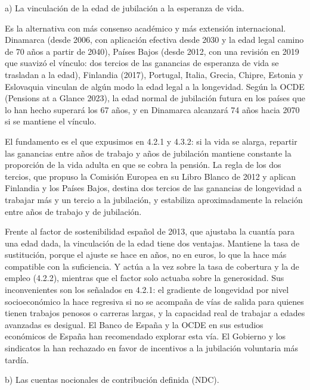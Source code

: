 \documentclass[10pt,a4paper]{article}
\begin{document}
a) La vinculación de la edad de jubilación a la esperanza de vida.

Es la alternativa con más consenso académico y más extensión internacional. Dinamarca (desde 2006, con aplicación efectiva desde 2030 y la edad legal camino de 70 años a partir de 2040), Países Bajos (desde 2012, con una revisión en 2019 que suavizó el vínculo: dos tercios de las ganancias de esperanza de vida se trasladan a la edad), Finlandia (2017), Portugal, Italia, Grecia, Chipre, Estonia y Eslovaquia vinculan de algún modo la edad legal a la longevidad. Según la OCDE (Pensions at a Glance 2023), la edad normal de jubilación futura en los países que lo han hecho superará los 67 años, y en Dinamarca alcanzará 74 años hacia 2070 si se mantiene el vínculo.

El fundamento es el que expusimos en 4.2.1 y 4.3.2: si la vida se alarga, repartir las ganancias entre años de trabajo y años de jubilación mantiene constante la proporción de la vida adulta en que se cobra la pensión. La regla de los dos tercios, que propuso la Comisión Europea en su Libro Blanco de 2012 y aplican Finlandia y los Países Bajos, destina dos tercios de las ganancias de longevidad a trabajar más y un tercio a la jubilación, y estabiliza aproximadamente la relación entre años de trabajo y de jubilación.

Frente al factor de sostenibilidad español de 2013, que ajustaba la cuantía para una edad dada, la vinculación de la edad tiene dos ventajas. Mantiene la tasa de sustitución, porque el ajuste se hace en años, no en euros, lo que la hace más compatible con la suficiencia. Y actúa a la vez sobre la tasa de cobertura y la de empleo (4.2.2), mientras que el factor solo actuaba sobre la generosidad. Sus inconvenientes son los señalados en 4.2.1: el gradiente de longevidad por nivel socioeconómico la hace regresiva si no se acompaña de vías de salida para quienes tienen trabajos penosos o carreras largas, y la capacidad real de trabajar a edades avanzadas es desigual. El Banco de España y la OCDE en sus estudios económicos de España han recomendado explorar esta vía. El Gobierno y los sindicatos la han rechazado en favor de incentivos a la jubilación voluntaria más tardía.

b) Las cuentas nocionales de contribución definida (NDC).
\end{document}
